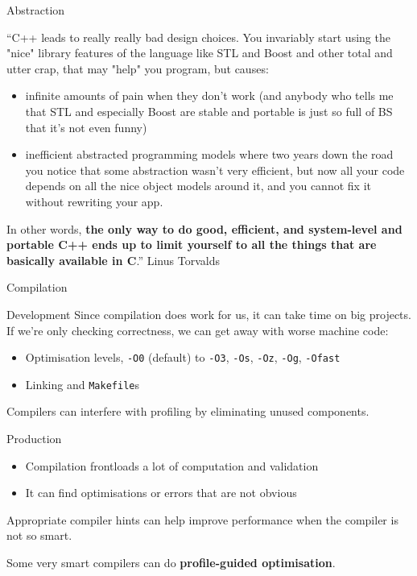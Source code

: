 \documentclass{beamer}
\begin{document}
\begin{frame}{Abstraction}
	\begin{block}{}
		``C++ leads to really really bad design choices. You invariably start using the "nice" library features of the language like STL and Boost and other total and utter crap, that may "help" you program, but causes:
		\begin{itemize}
			\item infinite amounts of pain when they don't work (and anybody who tells me that STL and especially Boost are stable and portable is just so full of BS that it's not even funny)
			\item inefficient abstracted programming models where two years down the road you notice that some abstraction wasn't very efficient, but now all your code depends on all the nice object models around it, and you cannot fix it without rewriting your app.
		\end{itemize}
		In other words, \textbf{the only way to do good, efficient, and system-level and portable C++ ends up to limit yourself to all the things that are basically available in C}.'' Linus Torvalds
	\end{block}%
\end{frame}


\begin{frame}{Compilation}
	\begin{block}{Development}
		Since compilation does work for us, it can take time on big projects. If we're only checking correctness, we can get away with worse machine code:
		\begin{itemize}
			\item Optimisation levels, \texttt{-O0} (default) to \texttt{-O3}, \texttt{-Os}, \texttt{-Oz}, \texttt{-Og}, \texttt{-Ofast}
			\item Linking and \texttt{Makefile}s
		\end{itemize}

		Compilers can interfere with profiling by eliminating unused components.
	\end{block}

	\begin{block}{Production}
		\begin{itemize}
			\item Compilation frontloads a lot of computation and validation
			\item It can find optimisations or errors that are not obvious
		\end{itemize}

		Appropriate compiler hints can help improve performance when the compiler is not so smart. %

		Some very smart compilers can do \textbf{profile-guided optimisation}.
	\end{block}
\end{frame}
\end{document}
